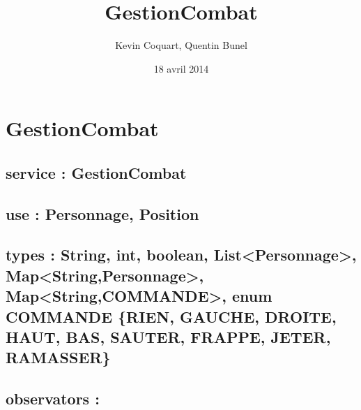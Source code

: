 \documentclass[11pt]{article}
\title{GestionCombat}
\author{Kevin Coquart, Quentin Bunel}
\date{18 avril 2014}
\begin{document}
\maketitle

\setcounter{tocdepth}{3}
\tableofcontents
\vspace*{1cm}
\section{GestionCombat}
\label{sec-1}

\subsection{service : GestionCombat}
\label{sec-1.1}

\subsection{use : Personnage, Position}
\label{sec-1.2}

\subsection{types : String, int, boolean, List<Personnage>, Map<String,Personnage>, Map<String,COMMANDE>, enum COMMANDE \{RIEN, GAUCHE, DROITE, HAUT, BAS, SAUTER, FRAPPE, JETER, RAMASSER\}}
\label{sec-1.3}

  

\subsection{observators :}
\label{sec-1.4}

\subsubsection{}
\end{document}
